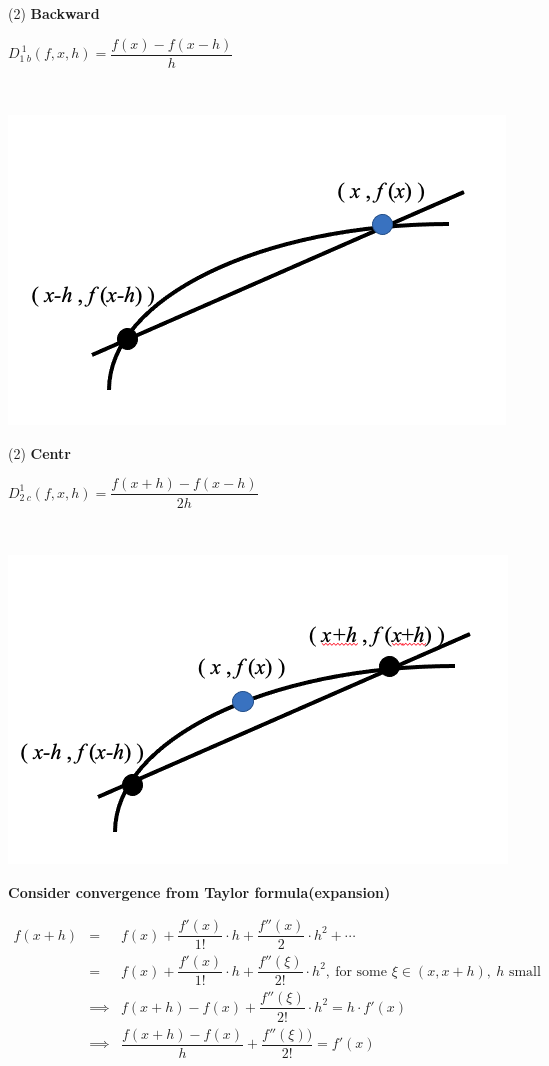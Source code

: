 \begin{tasks}(2)
	\task[ ]\textbf{Backward}

$D_{1~b}^{~1}(f,x,h) = \dfrac{f(x)-f(x-h)}{h}$
	
	\task[ ] $ $
	
	\includegraphics[scale=0.3]{figure/2}
\end{tasks}

\begin{tasks}(2)
	\task[ ]\textbf{Centr}

$D_{2~c}^{1}(f,x,h) = \dfrac{f(x+h)-f(x-h)}{2h}$
	
	\task[ ] $ $
	
	\includegraphics[scale=0.3]{figure/3}
\end{tasks}

\newpage

\textbf{Consider convergence from Taylor formula(expansion)}

\begin{eqnarray*}
	f(x+h) &=& f(x) + \dfrac{f'(x)}{1!}\cdot h+\dfrac{f''(x)}{2}\cdot h^2 + \cdots \\
	&=& f(x) + \dfrac{f'(x)}{1!}\cdot h + \dfrac{f''(\xi)}{2!}\cdot h^2,~\text{for some $\xi \in (x,x+h),~h$ small}\\
	&\implies& f(x+h) - f(x) + \dfrac{f''(\xi)}{2!}\cdot h^2 = h \cdot f'(x)\\
	&\implies& \dfrac{f(x+h)-f(x)}{h} + \dfrac{f''(\xi))}{2!} = f'(x) 
\end{eqnarray*}


